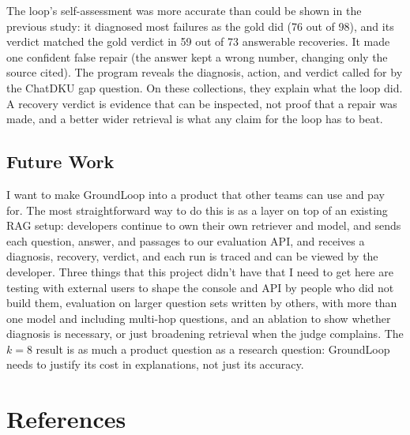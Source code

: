 \documentclass[12pt, a4paper, oneside]{report}
\newcommand{\instructions}[1]{}
\begin{document}
The loop's self-assessment was more accurate than could be shown in the
previous study: it diagnosed most failures as the gold did (76 out of 98),
and its verdict matched the gold verdict in 59 out of 73 answerable
recoveries. It made one confident false repair (the answer kept a wrong
number, changing only the source cited). The program reveals the diagnosis,
action, and verdict called for by the ChatDKU gap question. On these
collections, they explain what the loop did. A recovery verdict is evidence
that can be inspected, not proof that a repair was made, and a better wider
retrieval is what any claim for the loop has to beat.

\section{Future Work}

I want to make GroundLoop into a product that other teams can use and pay
for. The most straightforward way to do this is as a layer on top of an
existing RAG setup: developers continue to own their own retriever and
model, and sends each question, answer, and passages to our evaluation API,
and receives a diagnosis, recovery, verdict, and each run is traced and can
be viewed by the developer. Three things that this project didn't have that
I need to get here are testing with external users to shape the console and
API by people who did not build them, evaluation on larger question sets written by
others, with more than one model and including multi-hop questions, and an
ablation to show whether diagnosis is necessary, or just broadening
retrieval when the judge complains. The $k=8$ result is as much a product
question as a research question: GroundLoop needs to justify its cost in
explanations, not just its accuracy.


\chapter*{References}
\label{references}


\instructions{Many bibliographic styles are acceptable for publications in the natural sciences. This template uses a numeric style defined in biblatex and that is common in Physics, Mathematics, and Computer Science papers.}

\printbibliography[heading=none]
\end{document}
